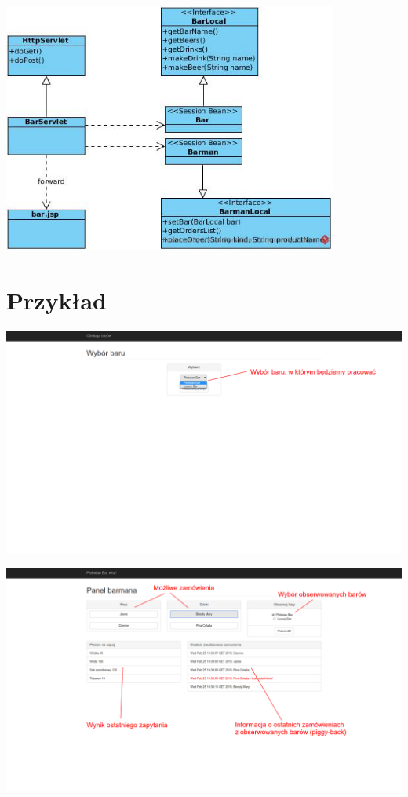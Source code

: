 \documentclass[11pt]{aghdpl}
\begin{document}
\begin{center}
 \includegraphics[width=11cm]{kontroler}
\end{center}

\chapter{Przykład}
\begin{center}
 \includegraphics[width=16cm]{zrzut1}
\end{center}
\begin{center}
 \includegraphics[width=16cm]{zrzut2}
\end{center}
\end{document}
